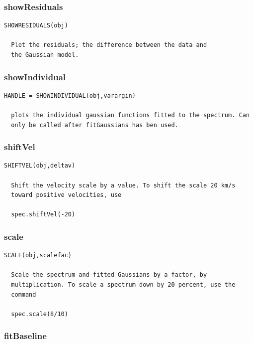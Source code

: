 \documentclass[11pt,a4paper]{article}
\begin{document}
\subsubsection*{showResiduals}
\label{sec:showresiduals}

\begin{lstlisting}[framerule=0pt]
  SHOWRESIDUALS(obj)
  
  Plot the residuals; the difference between the data and
  the Gaussian model. 
\end{lstlisting}

\subsubsection*{showIndividual}
\label{sec:showindividual}

\begin{lstlisting}[framerule=0pt]
  HANDLE = SHOWINDIVIDUAL(obj,varargin)
  
  plots the individual gaussian functions fitted to the spectrum. Can
  only be called after fitGaussians has ben used.            
\end{lstlisting}

\subsubsection*{shiftVel}
\label{sec:shiftvel}

\begin{lstlisting}[framerule=0pt]
  SHIFTVEL(obj,deltav)
  
  Shift the velocity scale by a value. To shift the scale 20 km/s
  toward positive velocities, use
  
  spec.shiftVel(-20)
\end{lstlisting}

\subsubsection*{scale}
\label{sec:scale}

\begin{lstlisting}[framerule=0pt]
  SCALE(obj,scalefac)
  
  Scale the spectrum and fitted Gaussians by a factor, by
  multiplication. To scale a spectrum down by 20 percent, use the
  command
  
  spec.scale(8/10)
\end{lstlisting}

\subsubsection*{fitBaseline}
\label{sec:fitbaseline}
\end{document}
